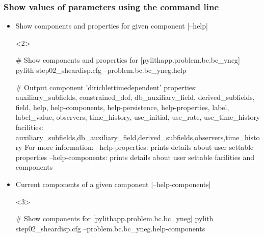 \documentclass[aspectratio=169]{beamer}
\begin{document}
\begin{frame}[t,fragile]
  \frametitle{Show values of parameters using the command line}

  \begin{itemize}
  \item Show components and properties for given component \bashinline|--help|
    \begin{onlyenv}<2>
      \begin{bashcode}
        # Show components and properties for [pylithapp.problem.bc.bc_yneg]
        pylith step02_sheardisp.cfg --problem.bc.bc_yneg.help

        # Output
        component 'dirichlettimedependent'
            properties: auxiliary_subfields, constrained_dof, db_auxiliary_field, derived_subfields, field, help, help-components, help-persistence, help-properties, label, label_value, observers, time_history, use_initial, use_rate, use_time_history
            facilities: auxiliary_subfields,db_auxiliary_field,derived_subfields,observers,time_history
        For more information:
            --help-properties: prints details about user settable properties
            --help-components: prints details about user settable facilities and components
      \end{bashcode}
    \end{onlyenv}    
  \item Current components of a given component \bashinline|--help-components|
    \begin{onlyenv}<3>
      \begin{bashcode}
        # Show components for [pylithapp.problem.bc.bc_yneg]
        pylith step02_sheardisp.cfg --problem.bc.bc_yneg.help-components


\end{bashcode}
\end{onlyenv}
\end{itemize}
\end{frame}
\end{document}
